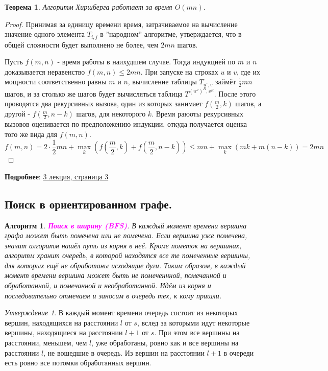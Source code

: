 \documentclass[a4paper]{article}
\theoremstyle{indented}
\newtheorem{theorem}{Теорема}
\newtheorem{alg}{Алгоритм}
\theoremstyle{definition}
\theoremstyle{remark}
\newtheorem{stat}{Утверждение}
\begin{document}
\begin{theorem}
    Алгоритм Хиршберга работает за время $O(mn)$. 
\end{theorem}

\begin{proof}
    Принимая за единицу времени время, затрачиваемое на вычисление значение одного элемента $T_{i, j}$ в ''народном'' алгоритме, утверждается, что в общей сложности будет выполнено не более, чем $2mn$ шагов. \ 

    Пусть $f(m, n)$ - время работы в наихудшем случае. Тогда индукцией по $m$ и $n$ доказывается неравенство $f(m, n)\leq 2mn$. При запуске на строках $u$ и $v$, где их мощности соответственно равны $m$ и $n$, вычисление таблицы $T_{u', v}$ займёт $\frac12 mn$ шагов, и за столько же шагов будет вычисляться таблица $T^{(u'')^R, v^R}$. После этого проводятся два рекурсивных вызова, один из которых занимает $f(\frac{m}{2}, k)$ шагов, а другой - $f(\frac{m}{2}, n-k)$ шагов, для некоторого $k$. Время раюоты рекурсивных вызовов оценивается по предположению индукции, откуда получается оценка того же вида для $f(m,n)$. 
    \[
        f(m, n)=2\cdot \frac12 mn+\max_k (f(\frac{m}{2}, k)+f(\frac{m}{2}, n-k))\leq mn+\max_k(mk+m(n-k))=2mn
    \]
\end{proof}

\textbf{Подробнее}: \href{https://users.math-cs.spbu.ru/~okhotin/teaching/algorithms_2020/okhotin_algorithms_2020_l3.pdf}{3 лекция, страница 3}

\subsection{Поиск в ориентированном графе.}

\begin{alg}
    \textcolor{magenta}{\hypertarget{t10}{\textbf{Поиск в ширину (BFS)}}}. В каждый момент времени вершина графа может быть помечена или не помечена. Если вершина уже помечена, значит алгоритм нашёл путь из корня в неё. Кроме пометок на вершинах, алгоритм хранит очередь, в которой находятся все те помеченные вершины, для которых ещё не обработаны исходящие дуги. Таким образом, в каждый момент времени вершина может быть не помеченнной, помечанной и обработанной, и помечанной и необработанной. Идём из корня и последовательно отмечаем и заносим в очередь тех, к кому пришли.
\end{alg}

\begin{stat}
    В каждый момент времени очередь состоит из некоторых вершин, находящихся на расстоянии $l$ от $s$, вслед за которыми идут некоторые вершины, находящиеся на расстоянии $l+1$ от $s$. При этом все вершины на расстоянии, меньшем, чем $l$, уже обработаны, ровно как и все вершины на расстоянии $l$, не вошедшие в очередь. Из вершин на расстоянии $l+1$ в очереди есть ровно все потомки обработанных вершин.
\end{stat}
\end{document}
